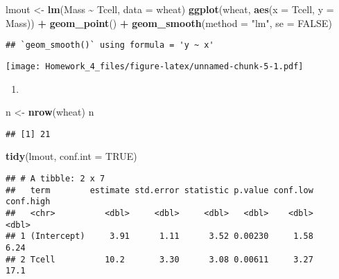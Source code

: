 \documentclass[
]{article}
\newenvironment{Shaded}{\begin{snugshade}}{\end{snugshade}}
\newcommand{\AttributeTok}[1]{\textcolor[rgb]{0.13,0.29,0.53}{#1}}
\newcommand{\ConstantTok}[1]{\textcolor[rgb]{0.56,0.35,0.01}{#1}}
\newcommand{\FunctionTok}[1]{\textcolor[rgb]{0.13,0.29,0.53}{\textbf{#1}}}
\newcommand{\NormalTok}[1]{#1}
\newcommand{\OtherTok}[1]{\textcolor[rgb]{0.56,0.35,0.01}{#1}}
\newcommand{\SpecialCharTok}[1]{\textcolor[rgb]{0.81,0.36,0.00}{\textbf{#1}}}
\newcommand{\StringTok}[1]{\textcolor[rgb]{0.31,0.60,0.02}{#1}}
\providecommand{\tightlist}{%
  \setlength{\itemsep}{0pt}\setlength{\parskip}{0pt}}
\begin{document}
\begin{Shaded}
\begin{Highlighting}[]
\NormalTok{lmout }\OtherTok{\textless{}{-}} \FunctionTok{lm}\NormalTok{(Mass }\SpecialCharTok{\textasciitilde{}}\NormalTok{ Tcell, }\AttributeTok{data =}\NormalTok{ wheat)}
\FunctionTok{ggplot}\NormalTok{(wheat, }\FunctionTok{aes}\NormalTok{(}\AttributeTok{x =}\NormalTok{ Tcell, }\AttributeTok{y =}\NormalTok{ Mass)) }\SpecialCharTok{+} 
  \FunctionTok{geom\_point}\NormalTok{() }\SpecialCharTok{+}
  \FunctionTok{geom\_smooth}\NormalTok{(}\AttributeTok{method =} \StringTok{"lm"}\NormalTok{, }\AttributeTok{se =} \ConstantTok{FALSE}\NormalTok{)}
\end{Highlighting}
\end{Shaded}

\begin{verbatim}
## `geom_smooth()` using formula = 'y ~ x'
\end{verbatim}

\texttt{[image: Homework\_4\_files/figure-latex/unnamed-chunk-5-1.pdf]}

\begin{enumerate}
\def\labelenumi{\arabic{enumi}.}
\tightlist
\item
\end{enumerate}

\begin{Shaded}
\begin{Highlighting}[]
\NormalTok{n }\OtherTok{\textless{}{-}} \FunctionTok{nrow}\NormalTok{(wheat)}
\NormalTok{n}
\end{Highlighting}
\end{Shaded}

\begin{verbatim}
## [1] 21
\end{verbatim}

\begin{Shaded}
\begin{Highlighting}[]
\FunctionTok{tidy}\NormalTok{(lmout, }\AttributeTok{conf.int =} \ConstantTok{TRUE}\NormalTok{)}
\end{Highlighting}
\end{Shaded}

\begin{verbatim}
## # A tibble: 2 x 7
##   term        estimate std.error statistic p.value conf.low conf.high
##   <chr>          <dbl>     <dbl>     <dbl>   <dbl>    <dbl>     <dbl>
## 1 (Intercept)     3.91      1.11      3.52 0.00230     1.58      6.24
## 2 Tcell          10.2       3.30      3.08 0.00611     3.27     17.1
\end{verbatim}
\end{document}
